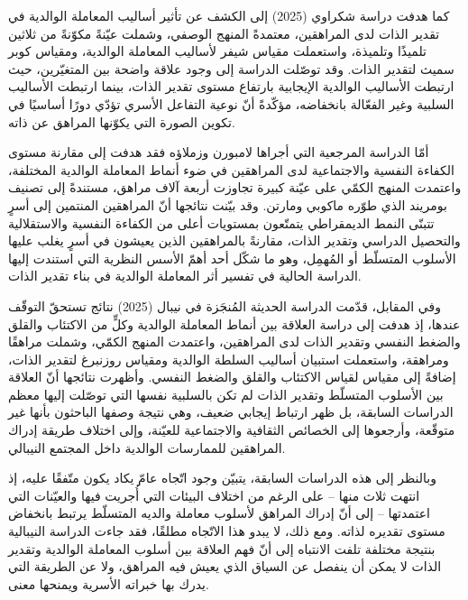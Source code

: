 كما هدفت دراسة شكراوي (2025) إلى الكشف عن تأثير أساليب المعاملة الوالدية في تقدير الذات لدى
المراهقين، معتمدةً المنهج الوصفي، وشملت عيّنةً مكوّنةً من ثلاثين تلميذًا وتلميذة، واستعملت مقياس شيفر
 لأساليب المعاملة الوالدية، ومقياس كوبر سميث  لتقدير الذات. وقد
توصّلت الدراسة إلى وجود علاقة واضحة بين المتغيّرين، حيث ارتبطت الأساليب الوالدية الإيجابية بارتفاع
مستوى تقدير الذات، بينما ارتبطت الأساليب السلبية وغير الفعّالة بانخفاضه، مؤكّدةً أنّ نوعية التفاعل
الأسري تؤدّي دورًا أساسيًا في تكوين الصورة التي يكوّنها المراهق عن ذاته.

أمّا الدراسة المرجعية التي أجراها لامبورن وزملاؤه  فقد هدفت إلى مقارنة
مستوى الكفاءة النفسية والاجتماعية لدى المراهقين في ضوء أنماط المعاملة الوالدية المختلفة، واعتمدت
المنهج الكمّي على عيّنة كبيرة تجاوزت أربعة آلاف مراهق، مستندةً إلى تصنيف بومريند الذي طوّره ماكوبي
ومارتن. وقد بيّنت نتائجها أنّ المراهقين المنتمين إلى أسرٍ تتبنّى النمط الديمقراطي يتمتّعون بمستويات أعلى
من الكفاءة النفسية والاستقلالية والتحصيل الدراسي وتقدير الذات، مقارنةً بالمراهقين الذين يعيشون في أسرٍ
يغلب عليها الأسلوب المتسلّط أو المُهمِل، وهو ما شكّل أحد أهمّ الأسس النظرية التي استندت إليها الدراسة
الحالية في تفسير أثر المعاملة الوالدية في بناء تقدير الذات.

وفي المقابل، قدّمت الدراسة الحديثة المُنجَزة في نيبال (2025) نتائج تستحقّ التوقّف عندها، إذ هدفت إلى
دراسة العلاقة بين أنماط المعاملة الوالدية وكلٍّ من الاكتئاب والقلق والضغط النفسي وتقدير الذات لدى
المراهقين، واعتمدت المنهج الكمّي، وشملت  مراهقًا ومراهقة، واستعملت استبيان أساليب السلطة
الوالدية ومقياس روزنبرغ  لتقدير الذات، إضافةً إلى مقياس  لقياس
الاكتئاب والقلق والضغط النفسي. وأظهرت نتائجها أنّ العلاقة بين الأسلوب المتسلّط وتقدير الذات لم تكن
بالسلبية نفسها التي توصّلت إليها معظم الدراسات السابقة، بل ظهر ارتباط إيجابي ضعيف، وهي نتيجة
وصفها الباحثون بأنها غير متوقّعة، وأرجعوها إلى الخصائص الثقافية والاجتماعية للعيّنة، وإلى اختلاف
طريقة إدراك المراهقين للممارسات الوالدية داخل المجتمع النيبالي.

وبالنظر إلى هذه الدراسات السابقة، يتبيّن وجود اتّجاه عامّ يكاد يكون متّفقًا عليه، إذ انتهت ثلاث منها --
على الرغم من اختلاف البيئات التي أُجريت فيها والعيّنات التي اعتمدتها -- إلى أنّ إدراك المراهق لأسلوب
معاملة والديه المتسلّط يرتبط بانخفاض مستوى تقديره لذاته. ومع ذلك، لا يبدو هذا الاتّجاه مطلقًا، فقد جاءت
الدراسة النيبالية بنتيجة مختلفة تلفت الانتباه إلى أنّ فهم العلاقة بين أسلوب المعاملة الوالدية وتقدير الذات لا
يمكن أن ينفصل عن السياق الذي يعيش فيه المراهق، ولا عن الطريقة التي يدرك بها خبراته الأسرية
ويمنحها معنى.

